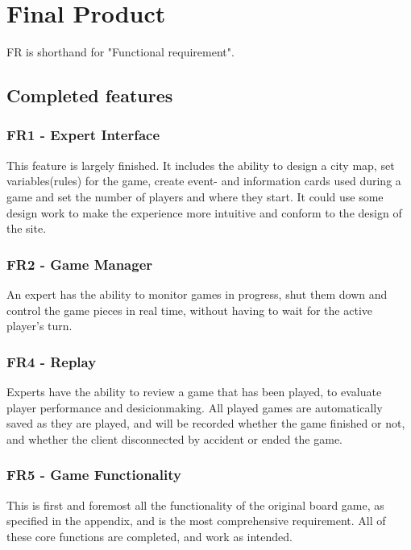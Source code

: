 \chapter{Final Product}

FR is shorthand for "Functional requirement".

\section{Completed features}

\subsection{FR1 - Expert Interface}
This feature is largely finished. It includes the ability to design a city map, set variables(rules) for the game, create event- and information cards used during a game and set the number of players and where they start. It could use some design work to make the experience more intuitive and conform to the design of the site.\\

\subsection{FR2 - Game Manager}
An expert has the ability to monitor games in progress, shut them down and control the game pieces in real time, without having to wait for the active player's turn.\\

\subsection{FR4 - Replay}
Experts have the ability to review a game that has been played, to evaluate player performance and desicionmaking. All played games are automatically saved as they are played, and will be recorded whether the game finished or not, and whether the client disconnected by accident or ended the game.\\

\subsection{FR5 - Game Functionality}
This is first and foremost all the functionality of the original board game, as specified in the appendix, and is the most comprehensive requirement. All of these core functions are completed, and work as intended.\\

